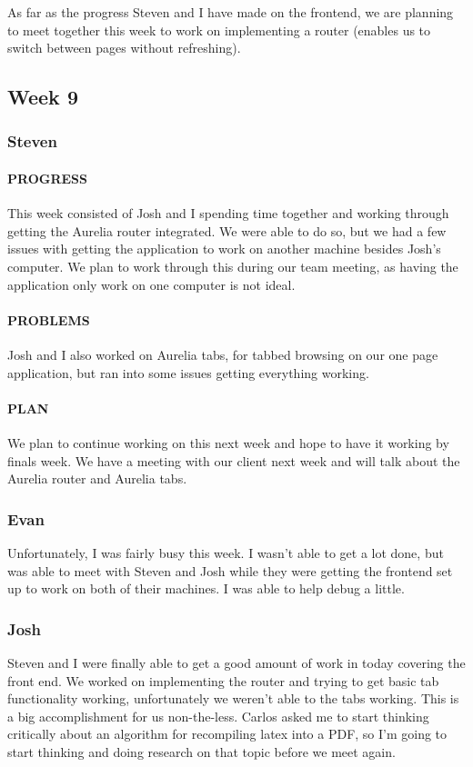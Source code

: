 \documentclass[onecolumn, draftclsnofoot,10pt, compsoc]{IEEEtran}
\begin{document}
	As far as the progress Steven and I have made on the frontend, we are planning to meet together this week to work on implementing a router (enables us to switch between pages without refreshing).
\subsection{Week 9}
	\subsubsection{Steven}
	\paragraph{PROGRESS}
	This week consisted of Josh and I spending time together and working through getting the Aurelia router integrated. We were able to do so, but we had a few issues with getting the application to work on another machine besides Josh's computer. We plan to work through this during our team meeting, as having the application only work on one computer is not ideal. 
	
	\paragraph{PROBLEMS}
	Josh and I also worked on Aurelia tabs, for tabbed browsing on our one page application, but ran into some issues getting  everything working.
	
	\paragraph{PLAN}
	We plan to continue working on this next week and hope to have it working by finals week. We have a meeting with our client next week and will talk about the Aurelia router and Aurelia tabs.
	
	\subsubsection{Evan}
	Unfortunately, I was fairly busy this week. I wasn't able to get a lot done, but was able to meet with Steven and Josh while they were getting the frontend set up to work on both of their machines. I was able to help debug a little. 
	
	\subsubsection{Josh}
	Steven and I were finally able to get a good amount of work in today covering the front end. We worked on implementing the router and trying to get basic tab functionality working, unfortunately we weren't able to the tabs working. This is a big accomplishment for us non-the-less. Carlos asked me to start thinking critically about an algorithm for recompiling latex into a PDF, so I'm going to start thinking and doing research on that topic before we meet again. 
\end{document}
